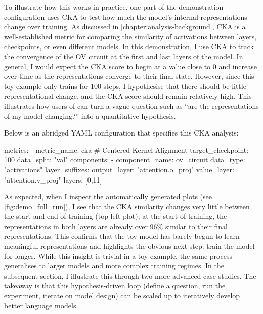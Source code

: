 To illustrate how this works in practice, one part of the demonstration configuration uses CKA to test how much the model's internal representations change over training. As discussed in \cref{chapter:analysis-background}, CKA is a well-established metric for comparing the similarity of activations between layers, checkpoints, or even different models. In this demonstration, I use CKA to track the convergence of the OV circuit at the first and last layers of the model. In general, I would expect the CKA score to begin at a value close to 0 and increase over time as the representations converge to their final state. However, since this toy example only trains for 100 steps, I hypothesise that there should be little representational change, and the CKA score should remain relatively high. This illustrates how users of \pico can turn a vague question such as “are the representations of my model changing?” into a quantitative hypothesis.

Below is an abridged YAML configuration that specifies this CKA analysis:

\begin{center}
\begin{configlisting}
    metrics:
    - metric_name: cka # Centered Kernel Alignment
      target_checkpoint: 100
      data_split: "val"
      components: 
        - component_name: ov_circuit
          data_type: "activations"
          layer_suffixes: 
            output_layer: "attention.o_proj"
            value_layer: "attention.v_proj"
          layers: [0,11]

\end{configlisting}
\end{center}

As expected, when I inspect the automatically generated plots (see \cref{fig:demo_full_run}), I see that the CKA similarity changes very little between the start and end of training (top left plot); at the start of training, the representations in both layers are already over 96\% similar to their final representations. This confirms that the toy model has barely begun to learn meaningful representations and highlights the obvious next step: train the model for longer. While this insight is trivial in a toy example, the same process generalises to larger models and more complex training regimes. In the subsequent section, I illustrate this through two more advanced case studies. The takeaway is that this hypothesis-driven loop (define a question, run the experiment, iterate on model design) can be scaled up to iteratively develop better language models.


